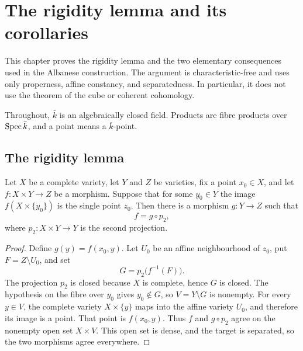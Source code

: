 \chapter{The rigidity lemma and its corollaries}
\label{chap:AbelianVarietyRigidity}
\label{chap:avr_for_rr}

This chapter proves the rigidity lemma and the two elementary consequences used in the
Albanese construction.  The argument is characteristic-free and uses only properness,
affine constancy, and separatedness.  In particular, it does not use the theorem of the
cube or coherent cohomology.

Throughout, \(\bar k\) is an algebraically closed field.  Products are fibre products over
\(\operatorname{Spec} \bar k\), and a point means a \(\bar k\)-point.

\section{The rigidity lemma}

\begin{lemma}
  \label{thm:rigidity_lemma}
  \leanok
  Let \(X\) be a complete variety, let \(Y\) and \(Z\) be varieties, fix a point
  \(x_0\in X\), and let \(f \colon X \times Y \to Z\) be a morphism.  Suppose that
  for some \(y_0 \in Y\) the image \(f(X \times \{y_0\})\) is the single point
  \(z_0\).  Then there is a morphism \(g \colon Y \to Z\) such that
  \[
    f = g \circ p_2,
  \]
  where \(p_2 \colon X \times Y \to Y\) is the second projection.
\end{lemma}
\begin{proof}
  \leanok
  Define \(g(y)=f(x_0,y)\).  Let \(U_0\) be an affine
  neighbourhood of \(z_0\), put \(F=Z\setminus U_0\), and set
  \[
    G=p_2\bigl(f^{-1}(F)\bigr).
  \]
  The projection \(p_2\) is closed because \(X\) is complete, hence \(G\) is closed.
  The hypothesis on the fibre over \(y_0\) gives \(y_0\notin G\), so
  \(V=Y\setminus G\) is nonempty.  For every \(y\in V\), the complete variety
  \(X\times\{y\}\) maps into the affine variety \(U_0\), and therefore its image is
  a point.  That point is \(f(x_0,y)\).  Thus \(f\) and \(g\circ p_2\) agree on the
  nonempty open set \(X\times V\).  This open set is dense, and the target is
  separated, so the two morphisms agree everywhere.
\end{proof}

